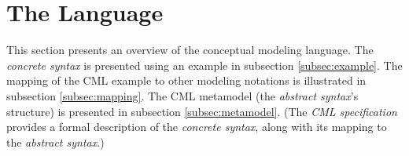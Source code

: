 \section{The Language}\label{sec:lang}
%
This section presents an overview of the conceptual modeling language.
The \emph{concrete syntax} is presented using an example in subsection \ref{subsec:example}.
The mapping of the CML example to other modeling notations is illustrated in subsection \ref{subsec:mapping}.
The CML metamodel (the \emph{abstract syntax}'s structure) is presented in subsection \ref{subsec:metamodel}.
(The \emph{CML specification} \cite{cml-repo} provides a formal description of the \emph{concrete syntax},
along with its mapping to the \emph{abstract syntax}.)




